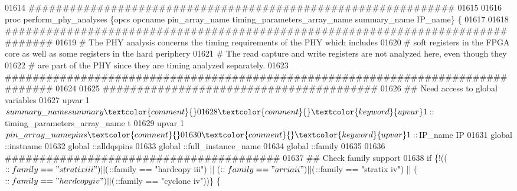 \begin{DoxyCode}
01614 \textcolor{comment}{}\textcolor{comment}{##############################################################}
01615 \textcolor{comment}{}
01616 \textcolor{keyword}{proc} perform\_phy\_analyses \{opcs opcname pin\_array\_name timing\_parameters\_array\_name summary\_name
       IP\_name\} \{
01617 
01618    \textcolor{comment}{################################################################################}
01619 \textcolor{comment}{}\textcolor{comment}{   }\textcolor{comment}{# The PHY analysis concerns the timing requirements of the PHY which includes}
01620 \textcolor{comment}{}\textcolor{comment}{   }\textcolor{comment}{# soft registers in the FPGA core as well as some registers in the hard periphery}
01621 \textcolor{comment}{}\textcolor{comment}{   }\textcolor{comment}{# The read capture and write registers are not analyzed here, even though they }
01622 \textcolor{comment}{}\textcolor{comment}{   }\textcolor{comment}{# are part of the PHY since they are timing analyzed separately. }
01623 \textcolor{comment}{}\textcolor{comment}{   }\textcolor{comment}{################################################################################}
01624 \textcolor{comment}{}
01625    \textcolor{comment}{########################################}
01626 \textcolor{comment}{}\textcolor{comment}{   }\textcolor{comment}{## Need access to global variables}
01627 \textcolor{comment}{}\textcolor{comment}{   }\textcolor{keyword}{upvar} 1 $summary\_name summary\textcolor{comment}{}
01628 \textcolor{comment}{}   \textcolor{keyword}{upvar} 1 ::$timing\_parameters\_array\_name t\textcolor{comment}{}
01629 \textcolor{comment}{}   \textcolor{keyword}{upvar} 1 $pin\_array\_name pins\textcolor{comment}{}
01630 \textcolor{comment}{}   \textcolor{keyword}{upvar} 1 ::$IP\_name IP\textcolor{comment}{}
01631 \textcolor{comment}{}   \textcolor{keyword}{global} ::instname\textcolor{comment}{   }
01632 \textcolor{comment}{}   \textcolor{keyword}{global} ::alldqspins\textcolor{comment}{}
01633 \textcolor{comment}{}   \textcolor{keyword}{global} ::full\_instance\_name\textcolor{comment}{}
01634 \textcolor{comment}{}   \textcolor{keyword}{global} ::family\textcolor{comment}{}
01635 \textcolor{comment}{}   
01636    \textcolor{comment}{########################################}
01637 \textcolor{comment}{}\textcolor{comment}{   }\textcolor{comment}{## Check family support}
01638 \textcolor{comment}{}\textcolor{comment}{   }\textcolor{keyword}{if} \{!(($::family == "stratix iii") || ($::family == "hardcopy iii") || ($::family == "arria ii") ||
       ($::family == "stratix iv") || ($::family == "hardcopy iv") || ($::family == "cyclone iv"))\} \{

\end{DoxyCode}
